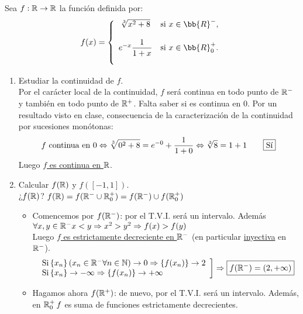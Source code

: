 \documentclass[12pt]{article}
\begin{document}
	\begin{ejercicio}[3 puntos] Sea $f: {\mathbb{R}} \rightarrow {\mathbb{R}}$ la función definida por:
		\[
		f(x)=
		\left \{
		\begin{array}{c l}
			\sqrt[3]{x^2+8} & \text{si $x \in \bb{R}^-$,} \\ \\
			e^{-x}\dfrac{1}{1+x} & \text{si $x \in \bb{R}_0^+$.} \\ \\
		\end{array}
		\right .
		\]
		\begin{enumerate}
			\item Estudiar la continuidad de $f$. \\
			Por el carácter local de la continuidad, $f$ será continua en todo punto de ${\mathbb{R}}^-$ y también en todo punto de ${\mathbb{R}}^+$. Falta saber si es continua en 0. Por un resultado visto en clase, consecuencia de la caracterización de la continuidad por sucesiones monótonas:
			\begin{gather*}
				f \text{ continua en } 0 \Leftrightarrow \sqrt[3]{0^2+8} = e^{-0} + \frac{1}{1+0} \Leftrightarrow \sqrt[3]{8} = 1+1 \qquad \fbox{Sí}  
			\end{gather*}
			Luego \underline{\underline{$f$ es continua en ${\mathbb{R}}$}}.
			\item Calcular $f({\mathbb{R}})$ y $f([-1,1])$.\\
			¿$f({\mathbb{R}})$? $f({\mathbb{R}})= f({\mathbb{R}}^- \cup {\mathbb{R}}^+_0) = f({\mathbb{R}}^-) \cup f({\mathbb{R}}^+_0)$ \\
			\begin{itemize}
				\item[\textasteriskcentered] Comencemos por $f({\mathbb{R}}^-)$: por el T.V.I. será un intervalo. Además $\forall x,y \in {\mathbb{R}}^- x < y \Rightarrow x^2 > y^2 \Rightarrow f(x) > f(y)$ \\
				Luego \underline{$f$ es estrictamente decreciente en ${\mathbb{R}}^-$} (en particular \underline{inyectiva} en ${\mathbb{R}}^-$).
				\[
				\left.
				\begin{array}{l}
					\text{Si} \left\{x_n\right\} (x_n \in {\mathbb{R}}^- \forall n \in {\mathbb{N}}) \rightarrow 0 \Rightarrow \left\{f(x_n)\right\} \rightarrow 2 \\
					\text{Si} \left\{x_n\right\} \rightarrow -\infty \Rightarrow \left\{f(x_n)\right\}
					\rightarrow +\infty
				\end{array}
				\right]
				\Rightarrow \boxed{f({\mathbb{R}}^-) = \left(2, +\infty\right)}
				\]
				\item[\textasteriskcentered] Hagamos ahora $f({\mathbb{R}}^+)$: de nuevo, por el T.V.I. será un intervalo. Además, en ${\mathbb{R}}_0^+ \, f$ es suma de funciones estrictamente decrecientes. \\

\end{itemize}
\end{enumerate}
\end{ejercicio}
\end{document}
